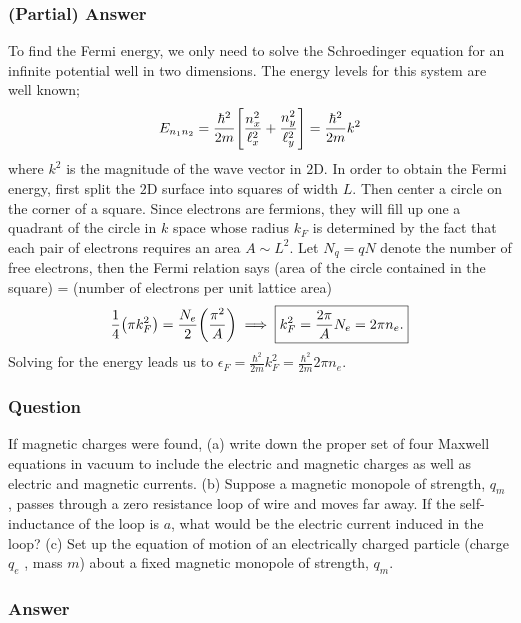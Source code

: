 \subsubsection{(Partial) Answer}
To find the Fermi energy, we only need to solve the Schroedinger equation for an infinite potential well in two dimensions. The energy levels for this system are well known;
\begin{equation}
	E_{n_1n_2} = \frac{\hbar^2}{2m}\qty[\frac{n_x^2}{\ell_x^2} + \frac{n_y^2}{\ell_y^2}] = \frac{\hbar^2}{2m}k^2
\end{equation}
where $k^2$ is the magnitude of the wave vector in $2$D. In order to obtain the Fermi energy, first split the $2$D surface into squares of width $L$. Then center a circle on the corner of a square. Since electrons are fermions, they will fill up one a quadrant of the circle in $k$ space whose radius $k_F$ is determined by the fact that each pair of electrons requires an area $A\sim L^2$. Let $N_q= qN$ denote the number of free electrons, then the Fermi relation says (area of the circle contained in the square) = (number of electrons per unit lattice area)
\begin{align}
	\frac{1}{4}\qty(\pi k_F^2) = \frac{N_e}{2}\qty(\frac{\pi^2}{A}) \implies \boxed{k_F^2 = \frac{2\pi}{A}N_e = 2\pi n_e.}
\end{align}
Solving for the energy leads us to $\epsilon_F = \frac{\hbar^2}{2m}k_F^2 = \frac{\hbar^2}{2m}2\pi n_e.$



\subsubsection{Question}
If magnetic charges were found, (a) write down the proper set of four Maxwell equations in vacuum to include the electric and magnetic charges as well as electric and magnetic currents. (b) Suppose a magnetic monopole of strength, $q_m$ , passes through a zero resistance loop of wire and moves far away. If the self-inductance of the loop is $a$, what would be the electric current induced in the loop? (c) Set up the equation of motion of an electrically charged particle (charge $q_e$ , mass $m$) about a fixed magnetic monopole of strength, $q_m$.
\subsubsection{Answer}

